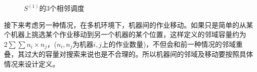 \begin{figure}[h]
\centering
\vspace{1.5em}
\\
\\
\caption{$S^{(1)}$的$3$个相邻调度\label{fig:3neighbors}}
\end{figure}

接下来考虑另一种情况，在多机环境下，机器间的作业移动。如果只是简单的从某个机器上挑选某个作业移动到另一个机器的某个位置，这样定义的邻域容量约为$2\sum\sum n_i\times n_j$，($n_i,n_j$为机器$i,j$上的作业数量)，不但会和前一种情况的邻域重叠，其过大的容量对搜索来说也是不合理的。所以机器间的邻域及移动要按照具体情况来设计定义。

